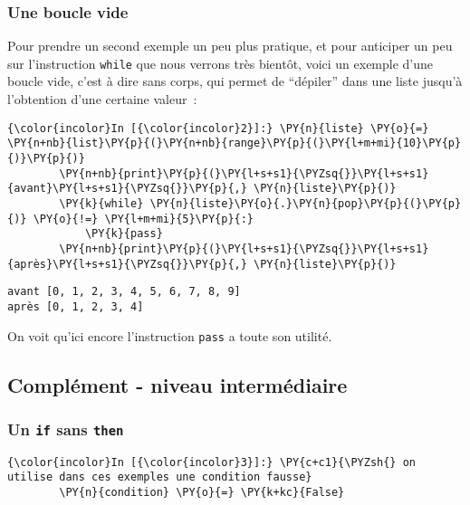     \hypertarget{une-boucle-vide}{%
\subsubsection{Une boucle vide}\label{une-boucle-vide}}

    Pour prendre un second exemple un peu plus pratique, et pour anticiper
un peu sur l'instruction \texttt{while} que nous verrons très bientôt,
voici un exemple d'une boucle vide, c'est à dire sans corps, qui permet
de ``dépiler'' dans une liste jusqu'à l'obtention d'une certaine
valeur~:

    \begin{Verbatim}[commandchars=\\\{\},frame=single,framerule=0.3mm,rulecolor=\color{cellframecolor}]
{\color{incolor}In [{\color{incolor}2}]:} \PY{n}{liste} \PY{o}{=} \PY{n+nb}{list}\PY{p}{(}\PY{n+nb}{range}\PY{p}{(}\PY{l+m+mi}{10}\PY{p}{)}\PY{p}{)}
        \PY{n+nb}{print}\PY{p}{(}\PY{l+s+s1}{\PYZsq{}}\PY{l+s+s1}{avant}\PY{l+s+s1}{\PYZsq{}}\PY{p}{,} \PY{n}{liste}\PY{p}{)}
        \PY{k}{while} \PY{n}{liste}\PY{o}{.}\PY{n}{pop}\PY{p}{(}\PY{p}{)} \PY{o}{!=} \PY{l+m+mi}{5}\PY{p}{:}
            \PY{k}{pass}
        \PY{n+nb}{print}\PY{p}{(}\PY{l+s+s1}{\PYZsq{}}\PY{l+s+s1}{après}\PY{l+s+s1}{\PYZsq{}}\PY{p}{,} \PY{n}{liste}\PY{p}{)}
\end{Verbatim}


    \begin{Verbatim}[commandchars=\\\{\},frame=single,framerule=0.3mm,rulecolor=\color{cellframecolor}]
avant [0, 1, 2, 3, 4, 5, 6, 7, 8, 9]
après [0, 1, 2, 3, 4]
\end{Verbatim}

    On voit qu'ici encore l'instruction \texttt{pass} a toute son utilité.

    \hypertarget{compluxe9ment---niveau-intermuxe9diaire}{%
\subsection{Complément - niveau
intermédiaire}\label{compluxe9ment---niveau-intermuxe9diaire}}

    \hypertarget{un-if-sans-then}{%
\subsubsection{\texorpdfstring{Un \texttt{if} sans
\texttt{then}}{Un if sans then}}\label{un-if-sans-then}}

    \begin{Verbatim}[commandchars=\\\{\},frame=single,framerule=0.3mm,rulecolor=\color{cellframecolor}]
{\color{incolor}In [{\color{incolor}3}]:} \PY{c+c1}{\PYZsh{} on utilise dans ces exemples une condition fausse}
        \PY{n}{condition} \PY{o}{=} \PY{k+kc}{False}
\end{Verbatim}


